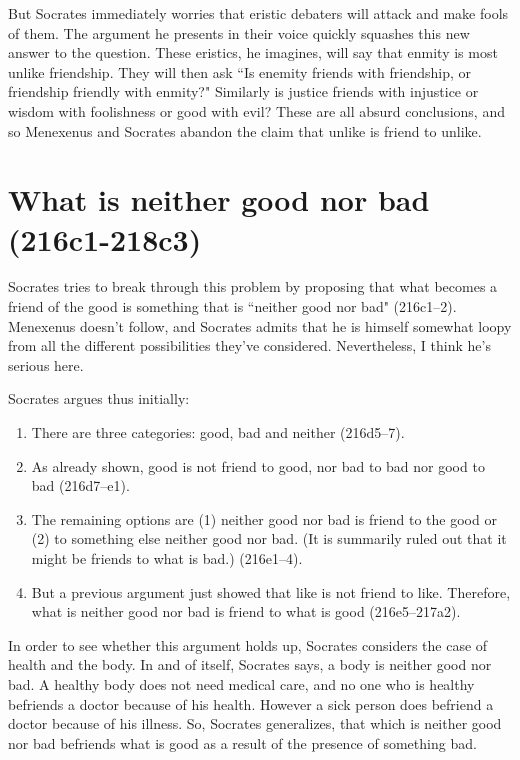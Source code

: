 \documentclass[11pt]{article}
\begin{document}
But Socrates immediately worries that eristic debaters will attack and make fools of them.  The argument he presents in their voice quickly squashes this new answer to the question.  These eristics, he imagines, will say that enmity is most unlike friendship.  They will then ask ``Is enemity friends with friendship, or friendship friendly with enmity?"  Similarly is justice friends with injustice or wisdom with foolishness or good with evil?  These are all absurd conclusions, and so Menexenus and Socrates abandon the claim that unlike is friend to unlike.


\section{What is neither good nor bad (216c1-218c3)}

Socrates tries to break through this problem by proposing that what becomes a friend of the good is something that is ``neither good nor bad" (216c1--2).  Menexenus doesn't follow, and Socrates admits that he is himself somewhat loopy from all the different possibilities they've considered.  Nevertheless, I think he's serious here.

Socrates argues thus initially:

\begin{enumerate}
    \item There are three categories: good, bad and neither (216d5--7).
    \item As already shown, good is not friend to good, nor bad to bad nor good to bad (216d7--e1).
    \item The remaining options are (1) neither good nor bad is friend to the good or (2) to something else neither good nor bad.  (It is summarily ruled out that it might be friends to what is bad.) (216e1--4).
    \item But a previous argument just showed that like is not friend to like.  Therefore, what is neither good nor bad is friend to what is good (216e5--217a2).
\end{enumerate}

In order to see whether this argument holds up, Socrates considers the case of health and the body.  In and of itself, Socrates says, a body is neither good nor bad.  A healthy body does not need medical care, and no one who is healthy befriends a doctor because of his health.  However a sick person does befriend a doctor because of his illness.  So, Socrates generalizes, that which is neither good nor bad befriends what is good as a result of the presence of something bad.
\end{document}
